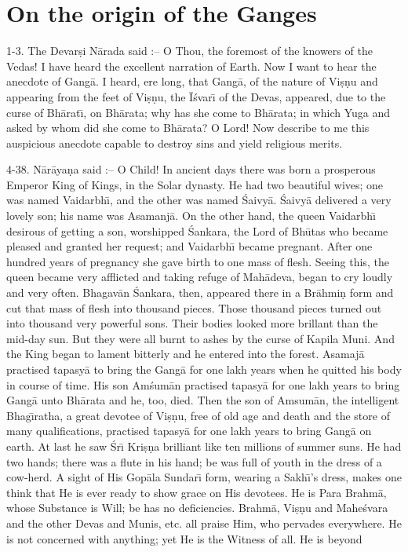 \chapter{On the origin of the Ganges}

1-3. The Devar\d{s}i N\=arada said :-- O Thou, the foremost of the knowers of the Vedas! I have heard the excellent narration of Earth. Now I want to hear the anecdote of Gang\=a. I heard, ere long, that Gang\=a, of the nature of Vi\d{s}\d{n}u and appearing from the feet of Vi\d{s}\d{n}u, the \=I\'svar\={\i} of the Devas, appeared, due to the curse of Bh\=arat\={\i}, on Bh\=arata; why has she come to Bh\=arata; in which Yuga and asked by whom did she come to Bh\=arata? O Lord! Now describe to me this auspicious anecdote capable to destroy sins and yield religious merits.

4-38. N\=ar\=aya\d{n}a said :-- O Child! In ancient days there was born a prosperous Emperor King of Kings, in the Solar dynasty. He had two beautiful wives; one was named Vaidarbh\={\i}, and the other was named \'Saivy\=a. \'Saivy\=a delivered a very lovely son; his name was Asamanj\=a. On the other hand, the queen Vaidarbh\={\i} desirous of getting a son, worshipped \'Sankara, the Lord of Bh\=utas who became pleased and granted her request; and Vaidarbh\={\i} became pregnant. After one hundred years of pregnancy she gave birth to one mass of flesh. Seeing this, the queen became very afflicted and taking refuge of Mah\=adeva, began to cry loudly and very often. Bhagav\=an \'Sankara, then, appeared there in a Br\=ahmi\d{n} form and cut that mass of flesh into thousand pieces. Those thousand pieces turned out into thousand very powerful sons. Their bodies looked more brillant than the mid-day sun. But they were all burnt to ashes by the curse of Kapila Muni. And the King began to lament bitterly and he entered into the forest. Asamaj\=a practised tapasy\=a to bring the Gang\=a for one lakh years when he quitted his body in course of time. His son Am\'sum\=an practised tapasy\=a for one lakh years to bring Gang\=a unto Bh\=arata and he, too, died. Then the son of Amsum\=an, the intelligent Bhag\={\i}ratha, a great devotee of Vi\d{s}\d{n}u, free of old age and death and the store of many qualifications, practised tapasy\=a for one lakh years to bring Gang\=a on earth. At last he saw \'Sr\={\i} Kri\d{s}\d{n}a brilliant like ten millions of summer suns. He had two hands; there was a flute in his hand; be was full of youth in the dress of a cow-herd. A sight of His Gop\=ala Sundar\={\i} form, wearing a Sakh\={\i}'s dress, makes one think that He is ever ready to show grace on His devotees. He is Para Brahm\=a, whose Substance is Will; be has no deficiencies. Brahm\=a, Vi\d{s}\d{n}u and Mahe\'svara and the other Devas and Munis, etc. all praise Him, who pervades everywhere. He is not concerned with anything; yet He is the Witness of all. He is beyond

